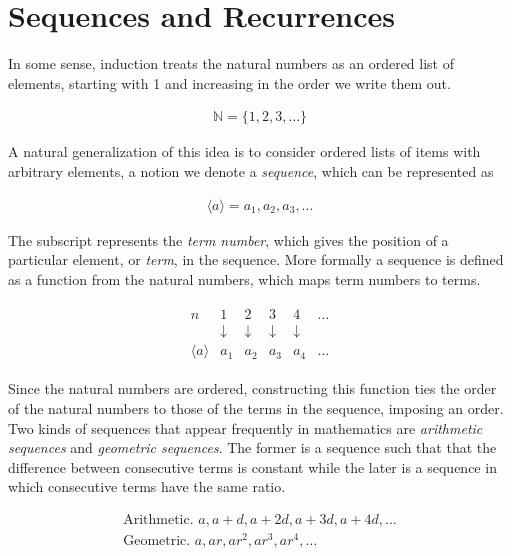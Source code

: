 \documentclass[twoside]{report}
\begin{document}
\section{Sequences and Recurrences}

In some sense, induction treats the natural numbers as an ordered list of elements, starting with 1 and increasing in the order we write them out.

\begin{align*}
	\mathbb{N} = \{ 1, 2, 3, \dots \}
\end{align*}

A natural generalization of this idea is to consider ordered lists of items with arbitrary elements, a notion we denote a \emph{sequence}, which can be represented as

\begin{align*}
	\langle a \rangle = a_1, a_2, a_3, \dots
\end{align*}

The subscript represents the \emph{term number}, which gives the position of a particular element, or \emph{term}, in the sequence. More formally a sequence is defined as a function from the natural numbers, which maps term numbers to terms.

\begin{align*}
	\begin{array}{rrrrrr}
		n & 1 & 2 & 3 & 4 & \dots \\
		& \downarrow & \downarrow & \downarrow & \downarrow & \\
		\langle a \rangle & a_1 & a_2 & a_3 & a_4 & \dots
	\end{array}
\end{align*}

Since the natural numbers are ordered, constructing this function ties the order of the natural numbers to those of the terms in the sequence, imposing an order. Two kinds of sequences that appear frequently in mathematics are \emph{arithmetic sequences} and \emph{geometric sequences}. The former is a sequence such that that the difference between consecutive terms is constant while the later is a sequence in which consecutive terms have the same ratio.

\begin{align*}
	\text{Arithmetic. } a, a + d, a + 2d, a + 3d, a + 4d, \dots \\
	\text{Geometric. } a, ar, ar^2, ar^3, ar^4, \dots \\
\end{align*}
\end{document}
